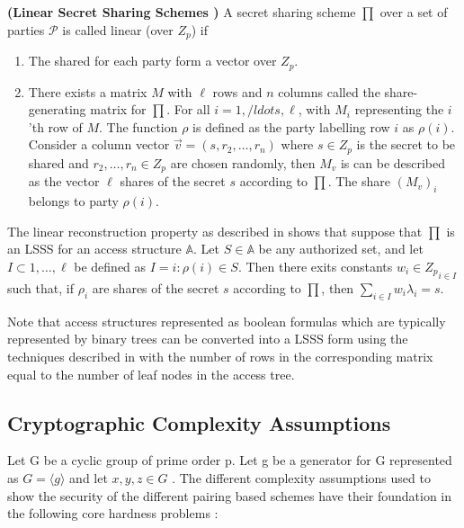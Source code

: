 \begin{definition}{\textbf{(Linear Secret Sharing Schemes \cite{Beimel1996, Waters2011})}}
	A secret sharing scheme $ \prod $ over a set of parties $ \mathcal{P} $ is called linear (over $ Z_{p} $) if
	\begin{enumerate}
		\item The shared for each party form a vector over $ Z_{p} $.
		
		\item There exists a matrix $ M $ with $ \ell $ rows and $ n $ columns called the share-generating matrix for $ \prod $. For all $ i = 1,/ldots,\ell $, with $ M_{i} $ representing the $i$'th row of $ M $. The function $ \rho $ is defined as the party labelling row $ i $ as $ \rho(i) $. Consider a column vector $ \vec{v} = (s, r_{2},\ldots,r_{n}) $ where $ s \in Z_{p} $ is the secret to be shared and $ r_{2},\ldots,r_{n} \in Z_{p} $ are chosen randomly, then $ M_{v} $ is can be described as the vector $ \ell $ shares of the secret $ s $ according to $ \prod $. The share $ (M_{v})_{i} $ belongs to party $ \rho(i) $.
		
	\end{enumerate}
\end{definition}

The linear reconstruction property as described in \cite{Beimel1996} shows that suppose that $ \prod $ is an LSSS for an access structure $ \mathbb{A} $. Let $ S \in \mathbb{A} $ be any authorized set, and let $ I \subset {1,\ldots,\ell} $ be defined as $ I = {i : \rho(i) \in S} $. Then there exits constants $ {w_{i} \in Z_{p}}_{i \in I} $ such that, if $ {\rho_{i}} $ are shares of the secret $ s $ according to $ \prod $, then $ \sum_{i \in I} w_{i}\lambda_{i} = s $.

Note that access structures represented as boolean formulas which are typically represented by binary trees can be converted into a LSSS form using the techniques described in \cite{Lewko2011b} with the number of rows in the corresponding matrix equal to the number of leaf nodes in the access tree.


\subsection{Cryptographic Complexity Assumptions}\label{cryphard}

Let G be a cyclic group of prime order p. Let g be a generator for G represented as $ G = \langle g \rangle $ and let $ x, y, z \in G $ . The different complexity assumptions used to show the security of the different pairing based schemes have their foundation in the following core hardness problems \cite{Lynn2007}:

